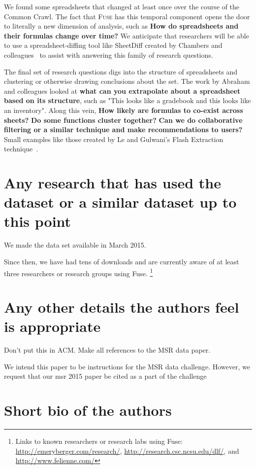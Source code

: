 \documentclass[conference]{IEEEtran}
\begin{document}
We found some spreadsheets that changed at least once over the course of the Common Crawl.
The fact that \textsc{Fuse} has this temporal component opens the door to literally a new dimension of analysis, such as \textbf{How do spreadsheets and their formulas change over time?}
We anticipate that researchers will be able to use a spreadsheet-diffing tool like SheetDiff created by Chambers and colleagues~\cite{chambers2010} to assist with answering this family of research questions.

The final set of research questions digs into the structure of spreadsheets and clustering or otherwise drawing conclusions about the set.
The work by Abraham and colleagues \cite{Abraham2006} looked at \textbf{what can you extrapolate about a spreadsheet based on its structure}, such as "This looks like a gradebook and this looks like an inventory".
Along this vein, \textbf{How likely are formulas to co-exist across sheets?} 
\textbf{Do some functions cluster together? }
\textbf{Can we do collaborative filtering or a similar technique and make recommendations to users? }
Small examples like those created by Le and Gulwani's Flash Extraction technique~\cite{le2014}.  


\section{Any research that has used the dataset or a similar dataset up to this point}
We made the data set available in March 2015.  

Since then, we have had tens of downloads and are currently aware of at least three researchers or research groups using Fuse.  
\footnote{Links to known researchers or research labs using Fuse: \url{http://emeryberger.com/research/}, \url{http://research.csc.ncsu.edu/dlf/}, and \url{http://www.felienne.com/}}



\section{Any other details the authors feel is appropriate}
Don't put this in ACM.  Make all references to the MSR data paper.

We intend this paper to be instructions for the MSR data challenge.  
However, we request that our msr 2015 paper be cited as a part of the challenge
\section{Short bio of the authors}




\end{document}
